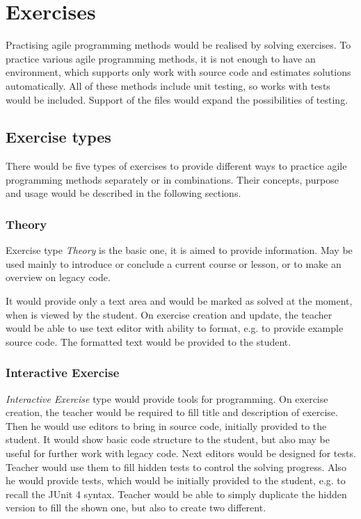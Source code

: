     \section{Exercises}
    \label{sec:exercises}
    Practising agile programming methods would be realised by solving exercises. To practice various agile programming methods, it is not enough to have an environment, which supports only work with source code and estimates solutions automatically. All of these methods include unit testing, so works with tests would be included. Support of the files would expand the possibilities of testing.


        \subsection{Exercise types}
        \label{subsec:exercise-types}
        There would be five types of exercises to provide different ways to practice agile programming methods separately or in combinations. Their concepts, purpose and usage would be described in the following sections.
            
            
            \subsubsection{Theory}
            Exercise type \textit{Theory} is the basic one, it is aimed to provide information. May be used mainly to introduce or conclude a current course or lesson, or to make an overview on legacy code.
            
            It would provide only a text area and would be marked as solved at the moment, when is viewed by the student. On exercise creation and update, the teacher would be able to use text editor with ability to format, e.g. to provide example source code. The formatted text would be provided to the student.
        
        
            \subsubsection{Interactive Exercise}
            \label{subsubsec:whitebox}
            \textit{Interactive Exercise} type would provide tools for programming.
            On exercise creation, the teacher would be required to fill title and description of exercise. Then he would use editors to bring in source code, initially provided to the student. It would show basic code structure to the student, but also may be useful for further work with legacy code. Next editors would be designed for tests. Teacher would use them to fill hidden tests to control the solving progress. Also he would provide tests, which would be initially provided to the student, e.g. to recall the JUnit 4 syntax. Teacher would be able to simply duplicate the hidden version to fill the shown one, but also to create two different.
            
